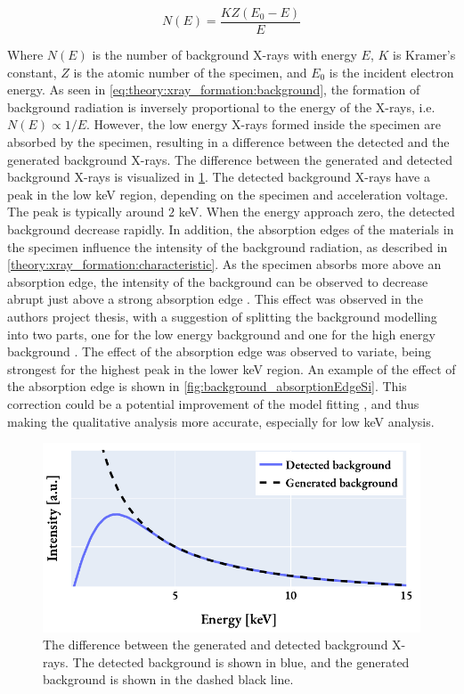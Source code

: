 \begin{equation}
    \label{eq:theory:xray_formation:background}
    N(E) = \frac{K Z (E_0-E)}{E}
\end{equation}

Where $N(E)$ is the number of background X-rays with energy $E$, $K$ is Kramer's constant, $Z$ is the atomic number of the specimen, and $E_0$ is the incident electron energy.
As seen in \cref{eq:theory:xray_formation:background}, the formation of background radiation is inversely proportional to the energy of the X-rays, i.e. $N(E) \propto 1/E$.
However, the low energy X-rays formed inside the specimen are absorbed by the specimen, resulting in a difference between the detected and the generated background X-rays.
The difference between the generated and detected background X-rays is visualized in \cref{fig:background_xrays}.
The detected background X-rays have a peak in the low keV region, depending on the specimen and acceleration voltage.
The peak is typically around $2$ keV.
When the energy approach zero, the detected background decrease rapidly.
In addition, the absorption edges of the materials in the specimen influence the intensity of the background radiation, as described in \cref{theory:xray_formation:characteristic}.
As the specimen absorbs more above an absorption edge, the intensity of the background can be observed to decrease abrupt just above a strong absorption edge \cite[p. 59]{goldstein_scanning_2018}.
This effect was observed in the authors project thesis, with a suggestion of splitting the background modelling into two parts, one for the low energy background and one for the high energy background \cite{project_report}.
The effect of the absorption edge was observed to variate, being strongest for the highest peak in the lower keV region.
An example of the effect of the absorption edge is shown in \cref{fig:background_absorptionEdgeSi}.
This correction could be a potential improvement of the model fitting \cite{hyperspy_1.7.1,nilsen_factorless_2021}, and thus making the qualitative analysis more accurate, especially for low keV analysis.


\begin{figure}[pht]
    \centering
    \includegraphics[width=0.8\linewidth]{figures/background_generated_detected.pdf}
    \caption{
        The difference between the generated and detected background X-rays.
        The detected background is shown in blue, and the generated background is shown in the dashed black line.
    }
    \label{fig:background_xrays}
\end{figure}

